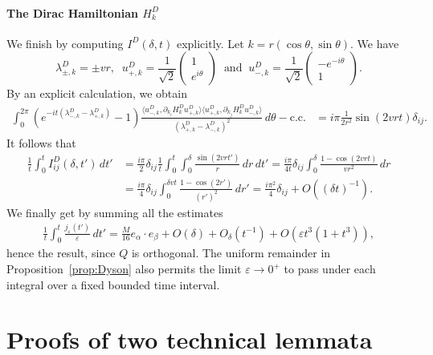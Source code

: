 \documentclass[a4paper,11pt]{article}
\theoremstyle{plain}
\theoremstyle{remark}
\def\eps{{\varepsilon}}
\def\1{{\mathds 1}}
\begin{document}
\paragraph{The Dirac Hamiltonian $H_k^{D}$}
We finish by computing $I^{D}(\delta,t)$ explicitly. Let
$k=r(\cos \theta, \sin \theta)$. We have
\[  \lambda^{D}_{\pm,k} = \pm v r,\;\;
  u^{D}_{+,k} = \frac 1 {\sqrt 2}
  \begin{pmatrix}
    1\\e^{i\theta}
  \end{pmatrix}\;\;\mbox{and}\;\;
  u^{D}_{-,k}= \frac 1 {\sqrt 2}
  \begin{pmatrix}
    -e^{-i\theta}\\1
  \end{pmatrix}.
  \]
By an explicit calculation, we obtain
\begin{align*}
  \int_{0}^{2\pi}(e^{-i t (\lambda^{D}_{-,k} - \lambda^{D}_{+,k})}-1)\frac{\langle u^{D}_{-,k}, \partial_{k_i} H_k^{D} u^{D}_{+,k} \rangle\langle u^{D}_{+,k},\partial_{k_j} H_k^{D} u^{D}_{-,k}\rangle}{(\lambda^{D}_{+,k} - \lambda^{D}_{-,k})^{2}} \, d\theta - \text{c.c.} &= i\pi \frac 1 {2r^{2}}\sin(2vrt) \delta_{ij}.
\end{align*}
It follows that
\begin{align*}
  \frac 1 t \int_{0}^{t}I_{ij}^{D}(\delta,t') \, dt' &= \frac {i\pi}{2}\delta_{ij} \frac1t\int_0^t \int_{0}^{\delta}\frac{\sin(2vrt')}{r} \, dr \, dt' = \frac{i\pi}{4 t}\delta_{ij}\int_{0}^{\delta}\frac{1 -  \cos(2vrt)}{vr^{2}} \, dr\\
  &=\frac{i\pi}{4} \delta_{ij} \int_{0}^{\delta vt}\frac{1-\cos(2r')}{(r')^2} \, dr' = \frac{i \pi^{2}}{4}\delta_{ij} + O\left((\delta t)^{-1}\right).
\end{align*}
We finally get by summing all the estimates
\begin{align*}
  \frac 1{t} \int_{0}^{t}  \frac{j_\eps(t')}{\eps} \, dt' = \frac {M} {16} e_\alpha \cdot e_\beta   +O(\delta)+O_\delta(t^{-1})+O(\eps t^3(1+t^3)),
\end{align*}
hence the result, since $Q$ is orthogonal. The uniform remainder
in Proposition~\ref{prop:Dyson} also permits the limit $\eps\to0^+$ to
pass under each integral over a fixed bounded time interval.


\appendix


\section{Proofs of two technical lemmata}
\end{document}
